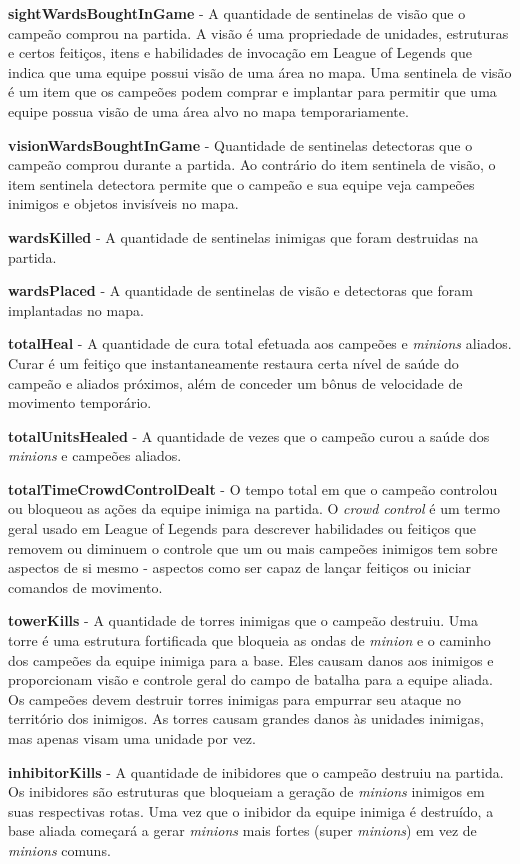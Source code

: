 \textbf{sightWardsBoughtInGame} - A quantidade de sentinelas de visão que o campeão comprou na partida. A visão é uma propriedade de unidades, estruturas e certos feitiços, itens e habilidades de invocação em League of Legends que indica que uma equipe possui visão de uma área no mapa. Uma sentinela de visão é um item que os campeões podem comprar e implantar para permitir que uma equipe possua visão de uma área alvo no mapa temporariamente.

\textbf{visionWardsBoughtInGame} - Quantidade de sentinelas detectoras que o campeão comprou durante a partida. Ao contrário do item sentinela de visão, o item sentinela detectora permite que o campeão e sua equipe veja campeões inimigos e objetos invisíveis no mapa.

\textbf{wardsKilled} - A quantidade de sentinelas inimigas que foram destruidas na partida.

\textbf{wardsPlaced} - A quantidade de sentinelas de visão e detectoras que foram implantadas no mapa.

\textbf{totalHeal} - A quantidade de cura total efetuada aos campeões e \textit{minions} aliados. Curar é um feitiço que instantaneamente restaura certa nível de saúde do campeão e aliados próximos, além de conceder um bônus de velocidade de movimento temporário.

\textbf{totalUnitsHealed} - A quantidade de vezes que o campeão curou a saúde dos \textit{minions} e campeões aliados.

\textbf{totalTimeCrowdControlDealt} - O tempo total em que o campeão controlou ou bloqueou as ações da equipe inimiga na partida. O \textit{crowd control} é um termo geral usado em League of Legends para descrever habilidades ou feitiços que removem ou diminuem o controle que um ou mais campeões inimigos tem sobre aspectos de si mesmo - aspectos como ser capaz de lançar feitiços ou iniciar comandos de movimento.

\textbf{towerKills} - A quantidade de torres inimigas que o campeão destruiu. Uma torre é uma estrutura fortificada que bloqueia as ondas de \textit{minion} e o caminho dos campeões da equipe inimiga para a base. Eles causam danos aos inimigos e proporcionam visão e controle geral do campo de batalha para a equipe aliada. Os campeões devem destruir torres inimigas para empurrar seu ataque no território dos inimigos. As torres causam grandes danos às unidades inimigas, mas apenas visam uma unidade por vez.

\textbf{inhibitorKills} - A quantidade de inibidores que o campeão destruiu na partida. Os inibidores são estruturas que bloqueiam a geração de \textit{minions} inimigos em suas respectivas rotas. Uma vez que o inibidor da equipe inimiga é destruído, a base aliada começará a gerar \textit{minions} mais fortes (super \textit{minions}) em vez de \textit{minions} comuns.


